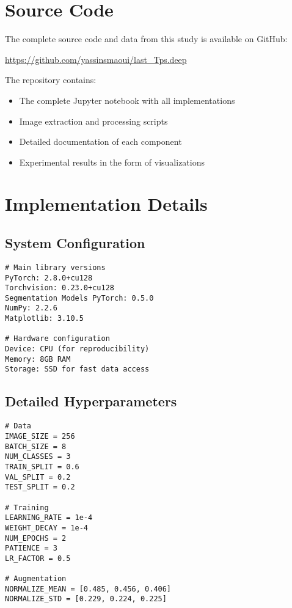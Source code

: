 \documentclass[12pt,a4paper]{article}
\begin{document}



\appendix

\section{Source Code}

The complete source code and data from this study is available on GitHub: 

\url{https://github.com/yassinsmaoui/last_Tps.deep}

The repository contains:
\begin{itemize}
    \item The complete Jupyter notebook with all implementations
    \item Image extraction and processing scripts
    \item Detailed documentation of each component
    \item Experimental results in the form of visualizations
\end{itemize}

\section{Implementation Details}

\subsection{System Configuration}

\begin{lstlisting}[caption=Experimental environment configuration]
# Main library versions
PyTorch: 2.8.0+cu128
Torchvision: 0.23.0+cu128
Segmentation Models PyTorch: 0.5.0
NumPy: 2.2.6
Matplotlib: 3.10.5

# Hardware configuration
Device: CPU (for reproducibility)
Memory: 8GB RAM
Storage: SSD for fast data access
\end{lstlisting}

\subsection{Detailed Hyperparameters}

\begin{lstlisting}[caption=Complete hyperparameter configuration]
# Data
IMAGE_SIZE = 256
BATCH_SIZE = 8
NUM_CLASSES = 3
TRAIN_SPLIT = 0.6
VAL_SPLIT = 0.2
TEST_SPLIT = 0.2

# Training
LEARNING_RATE = 1e-4
WEIGHT_DECAY = 1e-4
NUM_EPOCHS = 2
PATIENCE = 3
LR_FACTOR = 0.5

# Augmentation
NORMALIZE_MEAN = [0.485, 0.456, 0.406]
NORMALIZE_STD = [0.229, 0.224, 0.225]
\end{lstlisting}
\end{document}
